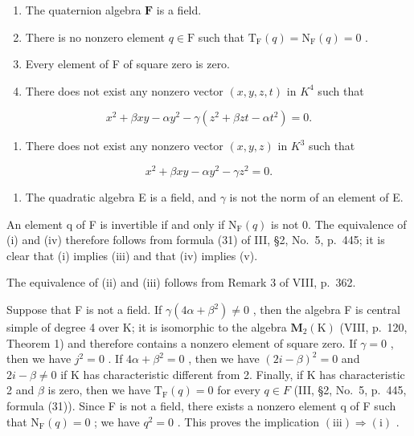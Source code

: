 \begin{enumerate}
\def\labelenumi{(\roman{enumi})}
\item
  The quaternion algebra \(\mathbf{F}\) is a field.
\item
  There is no nonzero element \(q \in \mathrm{F}\) such that \(\mathrm{T}_{\mathrm{F}}(q) = \mathrm{N}_{\mathrm{F}}(q) = 0\) .
\item
  Every element of F of square zero is zero.
\item
  There does not exist any nonzero vector \((x,y,z,t)\) in \(K^{4}\) such that
\end{enumerate}

\[
x ^ {2} + \beta x y - \alpha y ^ {2} - \gamma (z ^ {2} + \beta z t - \alpha t ^ {2}) = 0.
\]

\begin{enumerate}
\def\labelenumi{(\alph{enumi})}
\setcounter{enumi}{21}
\tightlist
\item
  There does not exist any nonzero vector \((x,y,z)\) in \(K^{3}\) such that
\end{enumerate}

\[
x ^ {2} + \beta x y - \alpha y ^ {2} - \gamma z ^ {2} = 0.
\]

\begin{enumerate}
\def\labelenumi{(\roman{enumi})}
\setcounter{enumi}{5}
\tightlist
\item
  The quadratic algebra E is a field, and \(\gamma\) is not the norm of an element of E.
\end{enumerate}

An element q of F is invertible if and only if \(\mathrm{N}_{\mathrm{F}}(q)\) is not 0. The equivalence of (i) and (iv) therefore follows from formula (31) of III, §2, No.~5, p.~445; it is clear that (i) implies (iii) and that (iv) implies (v).

The equivalence of (ii) and (iii) follows from Remark 3 of VIII, p.~362.

Suppose that F is not a field. If \(\gamma(4\alpha+\beta^{2})\neq0\) , then the algebra F is central simple of degree 4 over K; it is isomorphic to the algebra \(\mathbf{M}_{2}(\mathrm{K})\) (VIII, p.~120, Theorem 1) and therefore contains a nonzero element of square zero. If \(\gamma=0\) , then we have \(j^{2}=0\) . If \(4\alpha+\beta^{2}=0\) , then we have \((2i-\beta)^{2}=0\) and \(2i-\beta\neq0\) if K has characteristic different from 2. Finally, if K has characteristic 2 and \(\beta\) is zero, then we have \(\mathrm{T}_{\mathrm{F}}(q)=0\) for every \(q\in F\) (III, §2, No.~5, p.~445, formula (31)). Since F is not a field, there exists a nonzero element q of F such that \(\mathrm{N}_{\mathrm{F}}(q)=0\) ; we have \(q^{2}=0\) . This proves the implication \((\mathrm{iii})\Rightarrow(\mathrm{i})\) .


